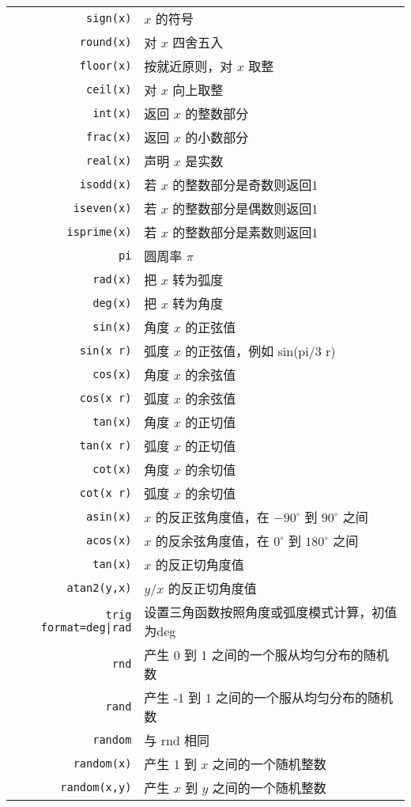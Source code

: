 \documentclass[UTF8]{ctexart}
\begin{document}
\begin{longtable}{r|l}
\verb=sign(x)= & $x$ 的符号\\
\verb=round(x)= & 对 $x$ 四舍五入\\
\verb=floor(x)= & 按就近原则，对 $x$ 取整\\
\verb=ceil(x)= & 对 $x$ 向上取整\\
\verb=int(x)= & 返回 $x$ 的整数部分\\
\verb=frac(x)= & 返回 $x$ 的小数部分\\
\verb=real(x)= & 声明 $x$ 是实数\\
\verb=isodd(x)= & 若 $x$ 的整数部分是奇数则返回1\\
\verb=iseven(x)= & 若 $x$ 的整数部分是偶数则返回1\\
\verb=isprime(x)= & 若 $x$ 的整数部分是素数则返回1\\
\verb=pi= & 圆周率 $\pi$\\
\verb=rad(x)= & 把 $x$ 转为弧度\\
\verb=deg(x)= & 把 $x$ 转为角度\\
\verb=sin(x)= & 角度 $x$ 的正弦值\\
\verb=sin(x r)= & 弧度 $x$ 的正弦值，例如 sin(pi/3 r)\\
\verb=cos(x)= & 角度 $x$ 的余弦值\\
\verb=cos(x r)= & 弧度 $x$ 的余弦值\\
\verb=tan(x)= & 角度 $x$ 的正切值\\
\verb=tan(x r)= & 弧度 $x$ 的正切值\\
\verb=cot(x)= & 角度 $x$ 的余切值\\
\verb=cot(x r)= & 弧度 $x$ 的余切值\\
\verb=asin(x)= & $x$ 的反正弦角度值，在 $-90^\circ$ 到 $90^\circ$ 之间\\
\verb=acos(x)= & $x$ 的反余弦角度值，在 $0^\circ$ 到 $180^\circ$ 之间\\
\verb=tan(x)= & $x$ 的反正切角度值\\
\verb=atan2(y,x)= & $y/x$ 的反正切角度值\\
\verb!trig format=deg|rad! & 设置三角函数按照角度或弧度模式计算，初值为deg\\
\verb=rnd= & 产生 0 到 1 之间的一个服从均匀分布的随机数\\
\verb=rand= & 产生 -1 到 1 之间的一个服从均匀分布的随机数\\
\verb=random= & 与 rnd 相同\\
\verb=random(x)= & 产生 1 到 $x$ 之间的一个随机整数\\
\verb=random(x,y)= & 产生 $x$ 到 $y$ 之间的一个随机整数\\

\end{longtable}
\end{document}
